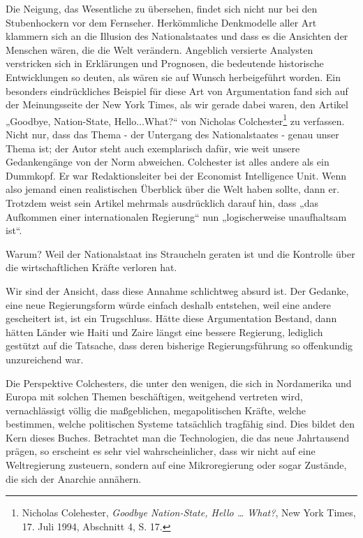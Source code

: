 \documentclass[
  a5paper,
  smalldemyvopaper,10pt,twoside,onecolumn,openright,extrafontsizes,hidelinks]{memoir}
\begin{document}
Die Neigung, das Wesentliche zu übersehen, findet sich nicht nur bei den
Stubenhockern vor dem Fernseher. Herkömmliche Denkmodelle aller Art
klammern sich an die Illusion des Nationalstaates und dass es die
Ansichten der Menschen wären, die die Welt verändern. Angeblich
versierte Analysten verstricken sich in Erklärungen und Prognosen, die
bedeutende historische Entwicklungen so deuten, als wären sie auf Wunsch
herbeigeführt worden. Ein besonders eindrückliches Beispiel für diese
Art von Argumentation fand sich auf der Meinungsseite der New York
Times, als wir gerade dabei waren, den Artikel „Goodbye, Nation-State,
Hello...What?{}`` von Nicholas Colchester\footnote{Nicholas Colehester,
  \emph{Goodbye Nation-State, Hello \ldots{} What?}, New York Times, 17.
  Juli 1994, Abschnitt 4, S. 17.} zu verfassen. Nicht nur, dass das
Thema - der Untergang des Nationalstaates - genau unser Thema ist; der
Autor steht auch exemplarisch dafür, wie weit unsere Gedankengänge von
der Norm abweichen. Colchester ist alles andere als ein Dummkopf. Er war
Redaktionsleiter bei der Economist Intelligence Unit. Wenn also jemand
einen realistischen Überblick über die Welt haben sollte, dann er.
Trotzdem weist sein Artikel mehrmals ausdrücklich darauf hin, dass „das
Aufkommen einer internationalen Regierung`` nun „logischerweise
unaufhaltsam ist``.

Warum? Weil der Nationalstaat ins Straucheln geraten ist und die
Kontrolle über die wirtschaftlichen Kräfte verloren hat.

Wir sind der Ansicht, dass diese Annahme schlichtweg absurd ist. Der
Gedanke, eine neue Regierungsform würde einfach deshalb entstehen, weil
eine andere gescheitert ist, ist ein Trugschluss. Hätte diese
Argumentation Bestand, dann hätten Länder wie Haiti und Zaire längst
eine bessere Regierung, lediglich gestützt auf die Tatsache, dass deren
bisherige Regierungsführung so offenkundig unzureichend war.

Die Perspektive Colchesters, die unter den wenigen, die sich in
Nordamerika und Europa mit solchen Themen beschäftigen, weitgehend
vertreten wird, vernachlässigt völlig die maßgeblichen, megapolitischen
Kräfte, welche bestimmen, welche politischen Systeme tatsächlich
tragfähig sind. Dies bildet den Kern dieses Buches. Betrachtet man die
Technologien, die das neue Jahrtausend prägen, so erscheint es sehr viel
wahrscheinlicher, dass wir nicht auf eine Weltregierung zusteuern,
sondern auf eine Mikroregierung oder sogar Zustände, die sich der
Anarchie annähern.
\end{document}
